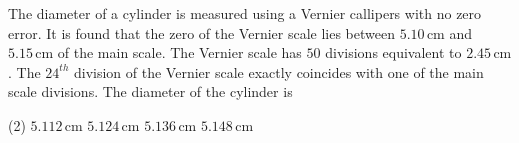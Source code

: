 
\item The diameter of a cylinder is measured using a Vernier callipers with no zero error. It is found that the zero of the Vernier scale lies between \(5.10 \, \text{cm}\) and \(5.15 \, \text{cm}\) of the main scale. The Vernier scale has \(50\) divisions equivalent to \(2.45 \, \text{cm}\). The \(24^{th}\) division of the Vernier scale exactly coincides with one of the main scale divisions. The diameter of the cylinder is

\begin{tasks}(2)
\task \(5.112 \, \text{cm}\)
\task \(5.124 \, \text{cm}\)
\task \(5.136 \, \text{cm}\)
\task \(5.148 \, \text{cm}\)
\end{tasks}
